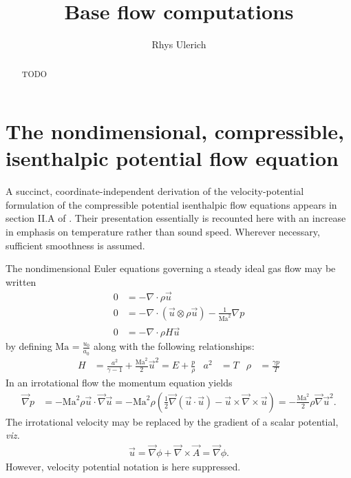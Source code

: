 \documentclass[letterpaper,11pt,nointlimits,reqno]{amsart}
\newcommand{\Mach}[1][]{\mbox{Ma}_{#1}}
\begin{document}
\title{Base flow computations}
\author{Rhys Ulerich}

\begin{abstract}
TODO
\end{abstract}

\maketitle

\tableofcontents

\section{The nondimensional, compressible, isenthalpic potential flow equation}

A succinct, coordinate-independent derivation of the velocity-potential
formulation of the compressible potential isenthalpic flow equations appears in
section II.A of \citet{Saad2011Coordinate}.  Their presentation essentially is
recounted here with an increase in emphasis on temperature rather than sound
speed. Wherever necessary, sufficient smoothness is assumed.

The nondimensional Euler equations governing a steady ideal gas flow may be written
\begin{align}
  \label{eq:continuity}
  0
&=
  - \nabla\cdot\rho{}\vec{u}
  \\
  \label{eq:momentum}
  0
&=
  - \nabla\cdot(\vec{u}\otimes\rho{}\vec{u})
  - \frac{1}{\Mach^{2}} \nabla{} p
  \\
  \label{eq:energy}
  0
&=
  - \nabla\cdot\rho{}H\vec{u}
\end{align}
by defining $\Mach = \frac{u_{0}}{a_{0}}$ along with the following
relationships:
\begin{align}
  \label{eq:eos}
  H &= \frac{a^2}{\gamma-1} + \frac{\Mach^2}{2}\vec{u}^2
     = E + \frac{p}{\rho}
  &
  a^2 &= T
  &
  \rho &= \frac{\gamma{} p}{T}
\end{align}
In an irrotational flow the momentum equation yields
\begin{align}
    \vec{\nabla}p
    &= - \Mach^2 \rho \vec{u}\cdot\vec{\nabla}\vec{u}
     = - \Mach^2 \rho \left(
           \frac{1}{2}\vec{\nabla}\left(\vec{u}\cdot\vec{u}\right)
         - \vec{u}\times\vec{\nabla}\times\vec{u}
        \right)
     = - \frac{\Mach^2}{2} \rho \vec{\nabla}\vec{u}^2.
\label{eq:irrot_momentum}
\end{align}
The irrotational velocity may be replaced by the gradient of a scalar
potential, \emph{viz.}
\begin{align}
  \vec{u} = \vec{\nabla}\phi + \vec{\nabla}\times\vec{A} = \vec{\nabla}{\phi}.
\end{align}
However, velocity potential notation is here suppressed.
\end{document}
